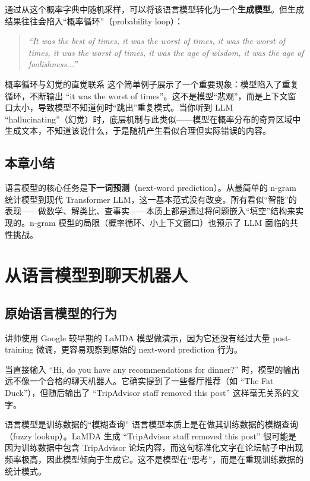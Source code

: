 \documentclass[a4paper]{article}
\begin{document}
通过从这个概率字典中随机采样，可以将该语言模型转化为一个\textbf{生成模型}。但生成结果往往会陷入``概率循环''（probability loop）：

\begin{quote}
\textit{``It was the best of times, it was the worst of times, it was the worst of times, it was the worst of times, it was the age of wisdom, it was the age of foolishness...''}
\end{quote}

\begin{warningbox}{概率循环与幻觉的直觉联系}
这个简单例子展示了一个重要现象：模型陷入了重复循环，不断输出 ``it was the worst of times''。这不是模型``悲观''，而是上下文窗口太小，导致模型不知道何时``跳出''重复模式。当你听到 LLM ``hallucinating''（幻觉）时，底层机制与此类似——模型在概率分布的奇异区域中生成文本，不知道该说什么，于是随机产生看似合理但实际错误的内容。
\end{warningbox}

\subsection{本章小结}

语言模型的核心任务是\textbf{下一词预测}（next-word prediction）。从最简单的 n-gram 统计模型到现代 Transformer LLM，这一基本范式没有改变。所有看似``智能''的表现——做数学、解类比、查事实——本质上都是通过将问题嵌入``填空''结构来实现的。n-gram 模型的局限（概率循环、小上下文窗口）也预示了 LLM 面临的共性挑战。

\section{从语言模型到聊天机器人}

\subsection{原始语言模型的行为}

讲师使用 Google 较早期的 LaMDA 模型做演示，因为它还没有经过大量 post-training 微调，更容易观察到原始的 next-word prediction 行为。

当直接输入 ``Hi, do you have any recommendations for dinner?'' 时，模型的输出远不像一个合格的聊天机器人。它确实提到了一些餐厅推荐（如 ``The Fat Duck''），但随后输出了 ``TripAdvisor staff removed this post'' 这样毫无关系的文字。

\begin{importantbox}{语言模型是训练数据的``模糊查询''}
语言模型本质上是在做其训练数据的模糊查询（fuzzy lookup）。LaMDA 生成 ``TripAdvisor staff removed this post'' 很可能是因为训练数据中包含 TripAdvisor 论坛内容，而这句标准化文字在论坛帖子中出现频率极高，因此模型倾向于生成它。这不是模型在``思考''，而是在重现训练数据的统计模式。
\end{importantbox}
\end{document}
